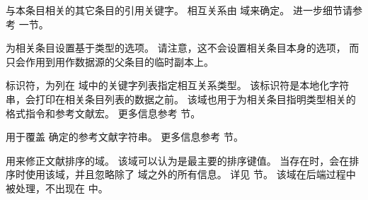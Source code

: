 \begin{fieldlist}
与本条目相关的其它条目的引用关键字。
相互关系由  域来确定。
进一步细节请参考  一节。




为相关条目设置基于类型的选项。
请注意，这不会设置相关条目本身的选项，
而只会作用到用作数据源的父条目的临时副本上。



标识符，为列在  域中的关键字列表指定相互关系类型。
该标识符是本地化字符串，会打印在相关条目列表的数据之前。
该域也用于为相关条目指明类型相关的格式指令和参考文献宏。
更多信息参考  节。




用于覆盖  确定的参考文献字符串。
更多信息参考  节。




用来修正文献排序的域。
该域可以认为是最主要的排序键值。
当存在时，\biblatex 会在排序时使用该域，并且忽略除了  域之外的所有信息。
详见  节。
该域在后端过程中被处理，不出现在  中。


\end{fieldlist}
